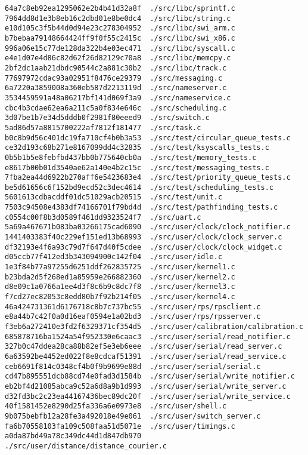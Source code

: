 \documentclass{article}
\begin{document}
\begin{verbatim}
64a7c8eb92ea1295062e2b4b41d32a8f  ./src/libc/sprintf.c
7964dd8d1e3b8eb16c2dbd01e8be0dc4  ./src/libc/string.c
e10d105c3f5b44d0d94e23c278304952  ./src/libc/swi_arm.c
b7bebaa79148664424ff9f0f55c2415c  ./src/libc/swi_x86.c
996a06e15c77de128da322b4e03ec471  ./src/libc/syscall.c
e4e1d07e4d86c82d62f26d82129c70a8  ./src/libc/memcpy.c
2bf2dc1aab21dbdc90544c2a881c30b2  ./src/libc/track.c
77697972cdac93a02951f8476ce29379  ./src/messaging.c
6a7220a3859008a360eb587d2213119d  ./src/nameserver.c
3534459591a48a06217bf141d069f3a9  ./src/nameservice.c
cbc4b3cdae62ea6a211c5a0f834e646c  ./src/scheduling.c
3d07be1b7e34d5dddb0f2981f80eeed9  ./src/switch.c
5ad86d57a8815700222af7812f181477  ./src/task.c
b0c8b9d56c401dc19fa710cf4b0b3a53  ./src/test/circular_queue_tests.c
ce32d193c68b271e8167099dd4c32835  ./src/test/ksyscalls_tests.c
0b5b1b5e8febfbd437bb0b775640cb0a  ./src/test/memory_tests.c
e8617b00b01d3540ae62a140e4b2c15c  ./src/test/messaging_tests.c
7fba2ea44d6922b270aff6e5423683e4  ./src/test/priority_queue_tests.c
be5d61656c6f152bd9ecd52c3dec4614  ./src/test/scheduling_tests.c
5601613cdbacddf01dc51029acb20515  ./src/test/unit.c
7503c94508e4383df74166701f79bd4d  ./src/test/pathfinding_tests.c
c0554c00f8b3d0589f461dd9323524f7  ./src/uart.c
5a69a467671b083ba03266175cad6090  ./src/user/clock/clock_notifier.c
1441403383f40c229ef151ed13b68993  ./src/user/clock/clock_server.c
df32193e4f6a93c79d7f647d40f5cdee  ./src/user/clock/clock_widget.c
d05ccb77f412ed3b343094900c142f04  ./src/user/idle.c
1e3f84b77a97255d6251ddf262835725  ./src/user/kernel1.c
b23bda2d5f268ed1a85959e266882360  ./src/user/kernel2.c
d8e09c1a0766a1ee4d3f8c6b9c8dc7f8  ./src/user/kernel3.c
f7cd27ec82053c8edd80b7f92b214f05  ./src/user/kernel4.c
46a424731361d6176718c8b7c737bc55  ./src/user/rps/rpsclient.c
e8a44b7c42f0a0d16eaf0594e1a02bd3  ./src/user/rps/rpsserver.c
f3eb6a272410e3fd2f6329371cf354d5  ./src/user/calibration/calibration.c
685878716ba1524a54f952330e6caac3  ./src/user/serial/read_notifier.c
327b0c47ddea28ca88b82ef5e3eb6eee  ./src/user/serial/read_server.c
6a63592be4452ed022f8e8cdcaf51391  ./src/user/serial/read_service.c
ceb6691f814c0348cf4b0f9b9699e88d  ./src/user/serial/serial.c
cd47b895551dcb88cd74e0fad3d1584b  ./src/user/serial/write_notifier.c
eb2bf4d21085abca9c52a6d8a9b1d993  ./src/user/serial/write_server.c
d32fd3bc2c23ea44167436bec89dc20f  ./src/user/serial/write_service.c
40f1581452e8290d25fa336a6e0973e8  ./src/user/shell.c
9b075bebfb12a28fe3a492018e49e061  ./src/user/switch_server.c
fa6b70558103fa109c508faa51d5071e  ./src/user/timings.c
a0da87bd49a78c349dc44d1d847db970  ./src/user/distance/distance_courier.c

\end{verbatim}
\end{document}
